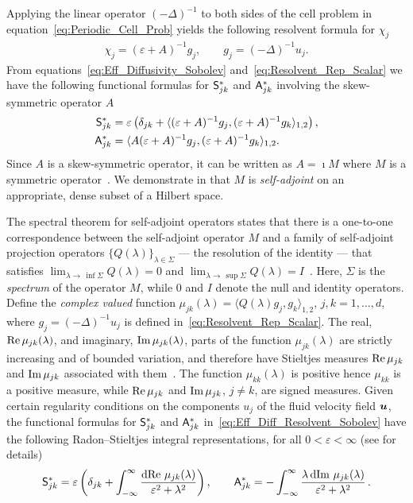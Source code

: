 \documentclass[amsa]{ipart}
\begin{document}
Applying the linear operator $(-\Delta)^{-1}$ to both sides of the cell
problem in equation~\eqref{eq:Periodic_Cell_Prob} yields the following
resolvent formula for $\chi_j$ 
%
\begin{align}\label{eq:Resolvent_Rep_Scalar}
  \chi_j=(\varepsilon+A)^{-1}g_j, \qquad 
  g_j=(-\Delta)^{-1}u_j.
\end{align}
%
From equations~\eqref{eq:Eff_Diffusivity_Sobolev}
and~\eqref{eq:Resolvent_Rep_Scalar} we have the following functional
formulas for $\mathsf{S}^*_{jk}$ and $\mathsf{A}^*_{jk}$ involving the
skew-symmetric operator $A$
%
\begin{align}\label{eq:Eff_Diff_Resolvent_Sobolev}
 \Sm^*_{jk}&=\varepsilon\left(\delta_{jk}
  +\langle(\varepsilon+A)^{-1}g_j,(\varepsilon+A)^{-1}g_k\rangle_{1,2}\right), 
  \\
 \Am^*_{jk}&=\langle A(\varepsilon+A)^{-1}g_j,(\varepsilon+A)^{-1}g_k\rangle_{1,2}.
 \notag
\end{align}
%
Since $A$ is a skew-symmetric operator, it can be written as $A=\imath M$
where $M$ is a symmetric operator~\cite{Stone:64}. We demonstrate in
 that $M$ is \emph{self-adjoint} on an
appropriate, dense subset of a Hilbert space.



The spectral theorem for self-adjoint operators states that there is a
one-to-one correspondence between the self-adjoint operator $M$ and a
family of self-adjoint projection operators $\{Q(\lambda)\}_{\lambda\in\Sigma}$ --- the
resolution of the identity --- that satisfies
$\lim_{\lambda\to\,\inf{\Sigma}}Q(\lambda)=0$ and
$\lim_{\lambda\to\,\sup{\Sigma}}Q(\lambda)=I$~\cite{Stone:64}. Here, $\Sigma$ is the
\emph{spectrum} of the operator $M$, while $0$ and $I$ denote the null
and identity operators. Define the \emph{complex valued} function
$\mu_{jk}(\lambda)=\langle Q(\lambda)g_j,g_k\rangle_{1,2}$, $j,k=1,\ldots,d$, where  $g_j=(-\Delta)^{-1}u_j$ is defined
in~\eqref{eq:Resolvent_Rep_Scalar}. The real, $\mbox{Re}\,\mu_{jk}(\lambda)$, and
imaginary, $\mbox{Im}\,\mu_{jk}(\lambda)$, parts of the function $\mu_{jk}(\lambda)$ are
strictly increasing and of bounded variation, and therefore have
Stieltjes measures $\mbox{Re}\,\mu_{jk}$ and $\mbox{Im}\,\mu_{jk}$ associated with
them~\cite{Stone:64}. The function $\mu_{kk}(\lambda)$ is positive hence
$\mu_{kk}$ is a positive measure, while $\mbox{Re}\,\mu_{jk}$ and $\mbox{Im}\,\mu_{jk}$,
$j\neq k$, are signed measures. Given certain regularity conditions on the
components $u_j$ of the fluid velocity field $\boldsymbol{u}$, the functional
formulas for $\mathsf{S}^*_{jk}$ and $\mathsf{A}^*_{jk}$
in~\eqref{eq:Eff_Diff_Resolvent_Sobolev} have the following
Radon--Stieltjes integral representations, for all $0<\varepsilon<\infty$ (see
 for details) 
%
\begin{align}\label{eq:Integral_Rep_kappa*}
  \Sm^*_{jk}=\varepsilon\left(\delta_{jk}+\int_{-\infty}^\infty\frac{\d\Real\,\mu_{jk}(\lambda)}{\varepsilon^2+\lambda^2}\right),
  \qquad
  \Am^*_{jk}=-\int_{-\infty}^\infty\frac{\lambda\,\d\Imag\,\mu_{jk}(\lambda)}{\varepsilon^2+\lambda^2}\,.         
\end{align}
%
\end{document}
